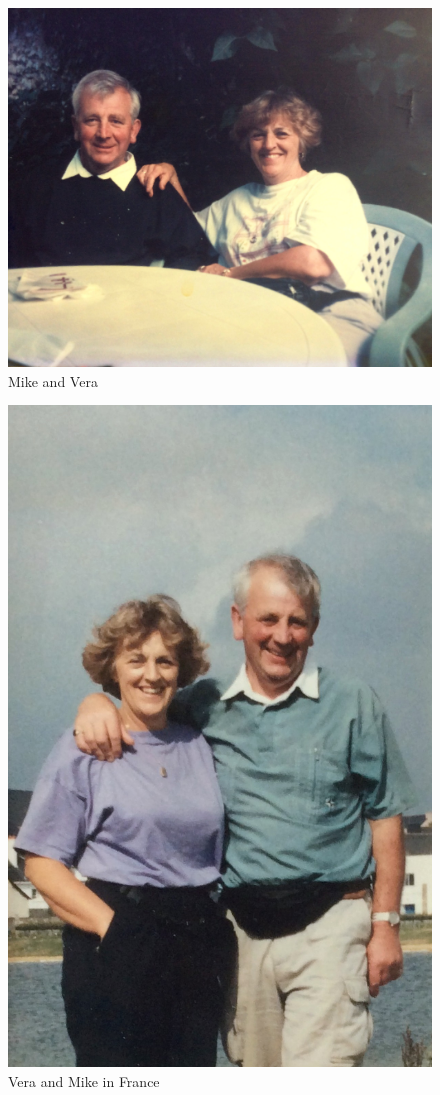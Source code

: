 \begin{figure}
  \centering
  \includegraphics[width=.9\linewidth]{pictures/cropped/Mike and Vera.jpg}
  \caption*{Mike and Vera}
\end{figure}

\begin{figure}
  \centering
  \includegraphics[width=.9\linewidth]{pictures/cropped/Vera and Mike in France.jpg}
  \caption*{Vera and Mike in France}
\end{figure}
